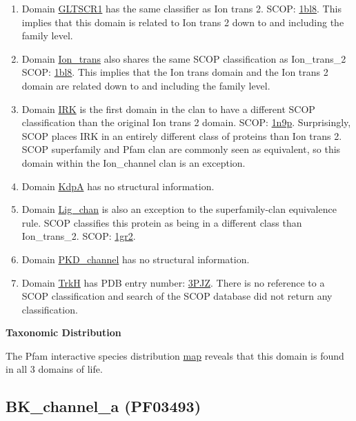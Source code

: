 \documentclass[11pt]{article}
\begin{document}
\begin{enumerate}
\item Domain \href{http://pfam.sanger.ac.uk/family/PF15249}{GLTSCR1} has the same classifier as Ion trans 2.
SCOP: \href{http://scop.mrc-lmb.cam.ac.uk/scop/search.cgi?tlev=fa;&pdb=1bl8}{1bl8}. This implies that this
domain is related to Ion trans 2 down to and including the family level.
\item Domain \href{http://pfam.sanger.ac.uk/family/PF00520}{Ion\_trans} also shares the same SCOP 
classification as Ion\_trans\_2 SCOP: \href{http://scop.mrc-lmb.cam.ac.uk/scop/search.cgi?tlev=fa;&pdb=1bl8}{1bl8}.  
This implies that the Ion trans domain and the Ion trans 2 domain are related down to and including the
family level.
\item Domain \href{http://pfam.sanger.ac.uk/family/PF01007}{IRK} is the first domain in the clan 
to have a different SCOP classification than the original Ion trans 2 domain. SCOP:
\href{http://scop.mrc-lmb.cam.ac.uk/scop/search.cgi?tlev=fa;&pdb=1n9p}{1n9p}. Surprisingly,
SCOP places IRK in an entirely different class of proteins than Ion trans 2. SCOP superfamily
and Pfam clan are commonly seen as equivalent, so this domain within the Ion\_channel clan 
is an exception.
\item Domain \href{http://pfam.sanger.ac.uk/family/PF03814}{KdpA} has no structural information.
\item Domain \href{http://pfam.sanger.ac.uk/family/PF00060}{Lig\_chan} is also an exception
to the superfamily-clan equivalence rule. SCOP classifies this protein as being in a 
different class than Ion\_trans\_2. SCOP: \href{http://scop.mrc-lmb.cam.ac.uk/scop/search.cgi?tlev=fa;&pdb=1gr2}{1gr2}.
\item Domain \href{http://pfam.sanger.ac.uk/family/PF08016}{PKD\_channel} has no structural information.
\item Domain \href{http://pfam.sanger.ac.uk/family/PF02386}{TrkH} has PDB entry number: \href{http://pfam.sanger.ac.uk/structure/3PJZ}{3PJZ}.
There is no reference to a SCOP classification and search of the SCOP database did not return any
classification.
\end{enumerate}

{\bf Taxonomic Distribution}

The Pfam interactive species distribution \href{http://pfam.sanger.ac.uk/family/PF07885.11#tabview=tab7}{map} 
reveals that this domain is found in all 3 domains of life.

\subsection*{BK\_channel\_a (PF03493)}
\end{document}
